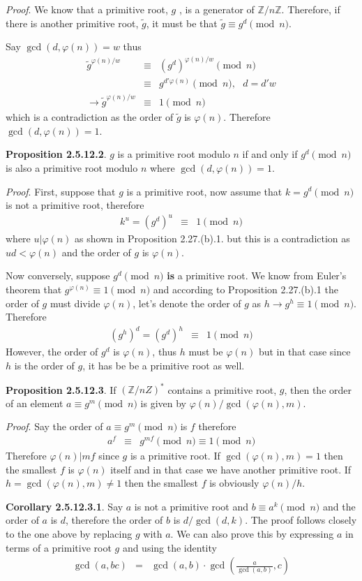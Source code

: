 \documentclass[aps,preprint,preprintnumbers,nofootinbib,showpacs,prd]{revtex4-1}
\newcommand{\nbea}{\begin{eqnarray*}}
\newcommand{\neea}{\end{eqnarray*}}
\begin{document}
{\it Proof}. We know that a primitive root, $g$ , is a generator of $\mathbb{Z}/n\mathbb{Z}$. Therefore, if there is another primitive root, $\tilde g$, it must be that $\tilde g \equiv g^d \pmod{n}$.

Say $\gcd(d, \varphi(n)) = w$ thus
%
\nbea
\tilde g^{\varphi(n)/w} & \equiv & (g^{d})^{\varphi(n)/w} \pmod{n} \\
& \equiv & g^{d'\varphi(n)} \pmod{n}, ~~~ d = d'w\\
\to \tilde g^{\varphi(n)/w} & \equiv & 1 \pmod{n}
\neea
%
which is a contradiction as the order of $\tilde g$ is $\varphi(n)$. Therefore $\gcd(d, \varphi(n)) = 1$.

{\bf Proposition 2.5.12.2}. $g$ is a primitive root modulo $n$ if and only if $g^d \pmod{n}$ is also a primitive root modulo $n$ where $\gcd(d,\varphi(n)) = 1$.

{\it Proof}. First, suppose that $g$ is a primitive root, now assume that $k = g^d \pmod{n}$ is not a primitive root, therefore
%
\nbea
k^u = (g^d)^u & \equiv & 1 \pmod{n}
\neea
%
where $u|\varphi(n)$ as shown in Proposition 2.27.(b).1. but this is a contradiction as $ud < \varphi(n)$ and the order of $g$ is $\varphi(n)$.

Now conversely, suppose $g^d \pmod{n}$ {\bf is} a primitive root. We know from Euler's theorem that $g^{\varphi(n)} \equiv 1 \pmod{n}$ and according to Proposition 2.27.(b).1 the order of $g$ must divide $\varphi(n)$, let's denote the order of $g$ as $h \to g^h \equiv 1 \pmod{n}$. Therefore
%
\nbea
(g^{h})^d = (g^d)^h & \equiv & 1 \pmod{n}
\neea
%
However, the order of $g^d$ is $\varphi(n)$, thus $h$ must be $\varphi(n)$ but in that case since $h$ is the order of $g$, it has be be a primitive root as well.

{\bf Proposition 2.5.12.3}.  If $(\mathbb{Z}/n{Z})^*$ contains a primitive root, $g$, then the order of an element $a \equiv g^m \pmod{n}$ is given by $\varphi(n)/\gcd(\varphi(n),m)$.

{\it Proof}. Say the order of $a \equiv g^m \pmod{n}$ is $f$ therefore
%
\nbea
a^{f} & \equiv & g^{mf} \pmod{n} \equiv 1 \pmod{n}
\neea
%
Therefore $\varphi(n)|mf$ since $g$ is a primitive root. If $\gcd(\varphi(n),m) = 1$ then the smallest $f$ is $\varphi(n)$ itself and in that case we have another primitive root. If $h=\gcd(\varphi(n),m) \neq 1$ then the smallest $f$ is obviously $\varphi(n)/h$.

{\bf Corollary 2.5.12.3.1}. Say $a$ is not a primitive root and $b \equiv a^k \pmod{n}$ and the order of $a$ is $d$, therefore the order of $b$ is $d/\gcd(d,k)$. The proof follows closely to the one above by replacing $g$ with $a$. We can also prove this by expressing $a$ in terms of a primitive root $g$ and using the identity
%
\nbea
\gcd(a,bc) & = & \gcd(a,b) \cdot \gcd\left ( \frac{a}{\gcd(a,b)}, c \right )
\neea
%
\end{document}

